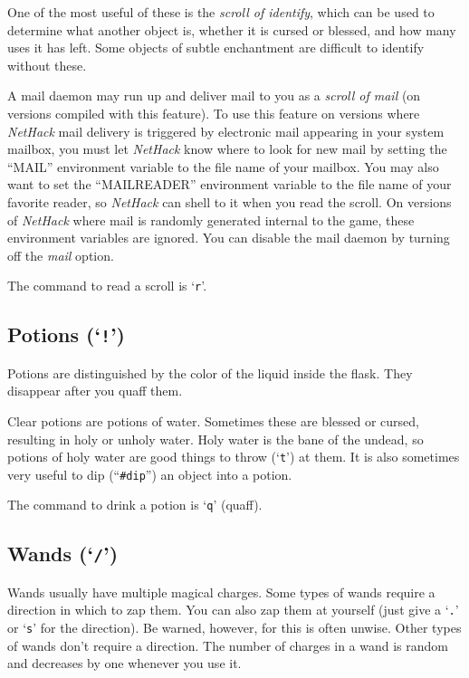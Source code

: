 One of the most useful of these is the %
{\it scroll of identify}, which
can be used to determine what another object is, whether it is cursed or
blessed, and how many uses it has left.  Some objects of subtle
enchantment are difficult to identify without these.

A mail daemon may run up and deliver mail to you as a %
{\it scroll of mail} (on versions compiled with this feature).
To use this feature on versions where {\it NetHack\/}
mail delivery is triggered by electronic mail appearing in your system mailbox,
you must let {\it NetHack\/} know where to look for new mail by setting the
``MAIL'' environment variable to the file name of your mailbox.
You may also want to set the ``MAILREADER'' environment variable to the
file name of your favorite reader, so {\it NetHack\/} can shell to it when you
read the scroll.
On versions of {\it NetHack\/} where mail is randomly
generated internal to the game, these environment variables are ignored.
You can disable the mail daemon by turning off the
{\it mail\/} option.

The command to read a scroll is `{\tt r}'.

\subsection*{Potions (`{\tt !}')}

Potions are distinguished by the color of the liquid inside the flask.
They disappear after you quaff them.

Clear potions are potions of water.  Sometimes these are
blessed or cursed, resulting in holy or unholy water.  Holy water is
the bane of the undead, so potions of holy water are good things to
throw (`{\tt t}') at them.  It is also sometimes very useful to dip
(``{\tt \#dip}'') an object into a potion.

The command to drink a potion is `{\tt q}' (quaff).

\subsection*{Wands (`{\tt /}')}

Wands usually have multiple magical charges.
Some types of wands require a direction in which to zap them.
You can also
zap them at yourself (just give a `{\tt .}' or `{\tt s}' for the direction).
Be warned, however, for this is often unwise.
Other types of wands
don't require a direction.  The number of charges in a
wand is random and decreases by one whenever you use it.

